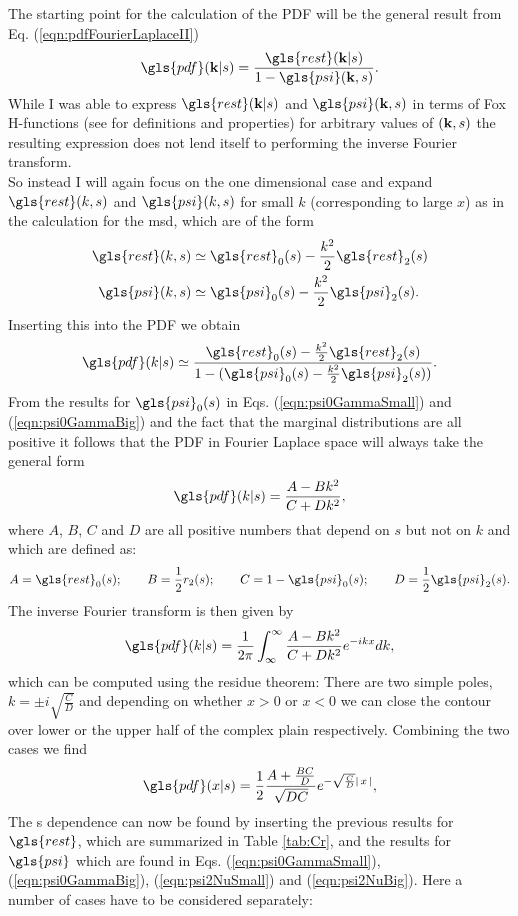 The starting point for the calculation of the \gls{PDF} will be the general result from Eq. (\ref{eqn:pdfFourierLaplaceII})
%
\begin{align}
\gls{pdf}(\ve{k}|s) = \frac{ \gls{rest}(\ve{k}|s)}{1 - \gls{psi}(\ve{k},s)} .
\end{align}
%
While I was able to express $\gls{rest}(\ve{k}|s)$ and $\gls{psi}(\ve{k},s)$ in terms of Fox H-functions (see \cite{mathai2009} for definitions and properties) for arbitrary values of $(\mathbf{ k },s)$ the resulting expression does not lend itself to performing the inverse Fourier transform. \\
So instead I will again focus on the one dimensional case and expand $\gls{rest}(k,s)$ and $\gls{psi}(k,s)$ for small $k$ (corresponding to large $x$) as in the calculation for the \gls{msd}, which are of the form 
%
\begin{align}
\gls{rest}(k,s) \simeq & \; \gls{rest}_0(s) - \frac{k^2}{2}  \gls{rest}_2(s)  \\
\gls{psi}(k,s) \simeq & \; \gls{psi}_0(s) - \frac{k^2}{2}  \gls{psi}_2(s)  .
\end{align}
%
Inserting this into the \gls{PDF} we obtain
%
\begin{align}
\gls{pdf}(k|s) \simeq \frac{ \gls{rest}_0(s) - \frac{k^2}{2}  \gls{rest}_2(s)}{1 - (\gls{psi}_0(s) - \frac{k^2}{2}  \gls{psi}_2(s))} .
\end{align}
%
From the results for $\gls{psi}_0(s)$ in Eqs. (\ref{eqn:psi0GammaSmall}) and (\ref{eqn:psi0GammaBig}) and the fact that the marginal distributions are all positive it follows that the \gls{PDF} in Fourier Laplace space will always take the general form 
%
\begin{align}
\gls{pdf}(k|s) = \frac{A- B k^2}{C+D k^2},
\end{align}
%
where $A$, $B$, $C$ and $D$ are all positive numbers that depend on $s$ but not on $k$ and which are defined as:
%
\begin{align}
A = \gls{rest}_0(s); \qquad B = \frac{1}{2} r_2(s); \qquad C = 1-\gls{psi}_0(s); \qquad D = \frac{1}{2} \gls{psi}_2(s) .
\end{align} 
%
The inverse Fourier transform is then given by 
%
\begin{align}
\gls{pdf}(k|s) = \frac{1}{2\pi} \int^{\infty}_{\infty} \frac{A- B k^2}{C+D k^2} e^{-ikx} dk ,
\end{align}
%
which can be computed using the residue theorem: There are two simple poles, $k= \pm i \sqrt{\frac{C}{D}}$ and depending on whether $x > 0$ or $x<0$  we can close the contour over lower or the upper half of the complex plain respectively. Combining the two cases we find 
%
\begin{align}
\gls{pdf}(x|s) = \frac{1}{2}  \frac{A+ \frac{BC}{D} }{\sqrt{DC}} e^{-\sqrt{\frac{C}{D}} \abs{x}},
\end{align}
%
The s dependence can now be found by inserting the previous results for $\gls{rest}$, which are summarized in Table \ref{tab:Cr}, and the results for $\gls{psi}$ which are found in Eqs. (\ref{eqn:psi0GammaSmall}), (\ref{eqn:psi0GammaBig}),  (\ref{eqn:psi2NuSmall}) and (\ref{eqn:psi2NuBig}). Here a number of cases have to be considered separately:

